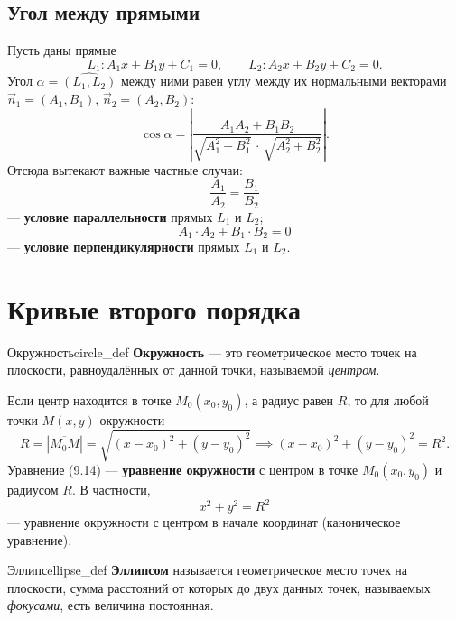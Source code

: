 \documentclass[12pt,a4paper]{article}
\begin{document}
\subsection*{Угол между прямыми}

Пусть даны прямые
\[
  L_1: A_1 x + B_1 y + C_1 = 0, \qquad L_2: A_2 x + B_2 y + C_2 = 0.
\]
Угол $\alpha = \widehat{(L_1, L_2)}$ между ними равен углу между их
нормальными векторами $\vec{n}_1 = (A_1, B_1)$, $\vec{n}_2 = (A_2, B_2)$:
\[
  \cos\alpha = \left| \frac{A_1 A_2 + B_1 B_2}
  {\sqrt{A_1^2 + B_1^2}\,\cdot\,\sqrt{A_2^2 + B_2^2}} \right|.
\]
Отсюда вытекают важные частные случаи:
\begin{equation}
  \frac{A_1}{A_2} = \frac{B_1}{B_2} \tag{9.12}
\end{equation}
— \textbf{условие параллельности} прямых $L_1$ и $L_2$;
\begin{equation}
  A_1 \cdot A_2 + B_1 \cdot B_2 = 0 \tag{9.13}
\end{equation}
— \textbf{условие перпендикулярности} прямых $L_1$ и $L_2$.

\section*{Кривые второго порядка}

\begin{definition}{Окружность}{circle_def}
  \textbf{Окружность} — это геометрическое место точек на плоскости,
  равноудалённых от данной точки, называемой \emph{центром}.
\end{definition}

Если центр находится в точке $M_0(x_0, y_0)$, а радиус равен $R$, то для
любой точки $M(x, y)$ окружности
\[
  R = |\overline{M_0 M}| = \sqrt{(x - x_0)^2 + (y - y_0)^2}
  \implies (x - x_0)^2 + (y - y_0)^2 = R^2. \tag{9.14}
\]
Уравнение (9.14) — \textbf{уравнение окружности} с центром в точке
$M_0(x_0, y_0)$ и радиусом $R$. В частности,
\[
  x^2 + y^2 = R^2
\]
— уравнение окружности с центром в начале координат (каноническое
уравнение).

\begin{definition}{Эллипс}{ellipse_def}
  \textbf{Эллипсом} называется геометрическое место точек на плоскости,
  сумма расстояний от которых до двух данных точек, называемых
  \emph{фокусами}, есть величина постоянная.
\end{definition}
\end{document}
